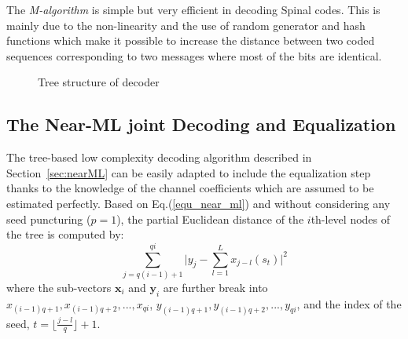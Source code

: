 \documentclass[conference]{IEEEtran}
\begin{document}
The \emph{M-algorithm} is simple but very efficient in decoding Spinal codes. This is mainly due to the non-linearity and the use of random generator and hash functions which make it possible to increase the distance between two coded sequences corresponding to two messages where most of the bits are identical.
\begin{figure}
\centering
{}
\caption{Tree structure of decoder}
\label{fig_decoderTree}
\end{figure}

\subsection{The Near-ML joint Decoding and Equalization}
The tree-based low complexity decoding algorithm described in Section~\ref{sec:nearML} can be easily adapted to include the equalization step thanks to the knowledge of the channel coefficients which are assumed to be estimated perfectly. 
Based on Eq.(\ref{equ_near_ml}) and without considering any seed puncturing ($p=1$), the partial Euclidean distance of the $i$th-level nodes of the tree  is computed by:
\begin{equation}
\sum_{j=q(i-1)+1}^{qi}\vert y_{j}-\sum_{l=1}^L x_{j-l}(s_{t})\vert^2
\label{equ_costEqu}
\end{equation}
where the sub-vectors $\textbf{x}_i$ and $\textbf{y}_i$ are further break into $x_{(i-1)q+1},x_{(i-1)q+2},...,x_{qi}$, $y_{(i-1)q+1},y_{(i-1)q+2},...,y_{qi}$, and the index of the seed, $t=\lfloor\frac{j-l}{q}\rfloor +1$.
\end{document}
